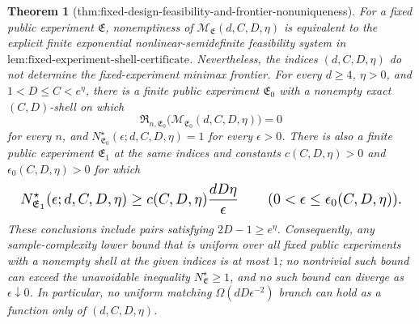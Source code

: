 \documentclass{article}
\newtheorem{theorem}{Theorem}
\begin{document}
\begin{theorem}[thm:fixed-design-feasibility-and-frontier-nonuniqueness]\label{thm:fixed-design-feasibility-and-frontier-nonuniqueness}
For a fixed public experiment \(\mathfrak E\), nonemptiness of \(\mathcal M_{\mathfrak E}(d,C,D,\eta)\) is equivalent to the explicit finite exponential nonlinear-semidefinite feasibility system in \(\text{lem:fixed-experiment-shell-certificate}\). Nevertheless, the indices \((d,C,D,\eta)\) do not determine the fixed-experiment minimax frontier. For every \(d\ge4\), \(\eta>0\), and \(1<D\le C<e^\eta\), there is a finite public experiment \(\mathfrak E_0\) with a nonempty exact \((C,D)\)-shell on which
\[
\mathfrak R_{n,\mathfrak E_0}\bigl(\mathcal M_{\mathfrak E_0}(d,C,D,\eta)\bigr)=0
\]
for every \(n\), and \(N^\star_{\mathfrak E_0}(\epsilon;d,C,D,\eta)=1\) for every \(\epsilon>0\). There is also a finite public experiment \(\mathfrak E_1\) at the same indices and constants \(c(C,D,\eta)>0\) and \(\epsilon_0(C,D,\eta)>0\) for which
\[
\makebox[\linewidth][c]{\resizebox{0.98\linewidth}{!}{\(\displaystyle N^\star_{\mathfrak E_1}(\epsilon;d,C,D,\eta)\ge c(C,D,\eta)\frac{dD\eta}{\epsilon}
\qquad(0<\epsilon\le\epsilon_0(C,D,\eta)).\)}}
\]
These conclusions include pairs satisfying \(2D-1\ge e^\eta\). Consequently, any sample-complexity lower bound that is uniform over all fixed public experiments with a nonempty shell at the given indices is at most \(1\); no nontrivial such bound can exceed the unavoidable inequality \(N^\star_{\mathfrak E}\ge1\), and no such bound can diverge as \(\epsilon\downarrow0\). In particular, no uniform matching \(\Omega(dD\epsilon^{-2})\) branch can hold as a function only of \((d,C,D,\eta)\).
\end{theorem}
\end{document}
